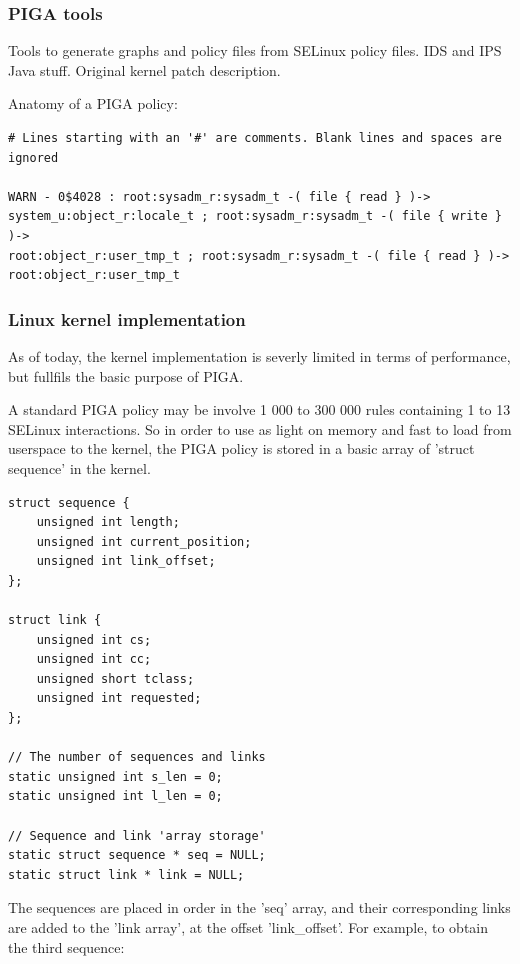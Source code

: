 \documentclass[pdftex,a4paper,titlepage,11pt]{article}
\begin{document}
\subsubsection{PIGA tools}

Tools to generate graphs and policy files from SELinux policy files. IDS and IPS
Java stuff. Original kernel patch description.

Anatomy of a PIGA policy:

\begin{lstlisting}
# Lines starting with an '#' are comments. Blank lines and spaces are ignored

WARN - 0$4028 : root:sysadm_r:sysadm_t -( file { read } )->
system_u:object_r:locale_t ; root:sysadm_r:sysadm_t -( file { write } )->
root:object_r:user_tmp_t ; root:sysadm_r:sysadm_t -( file { read } )->
root:object_r:user_tmp_t
\end{lstlisting}


\subsubsection{Linux kernel implementation}

As of today, the kernel implementation is severly limited in terms of
performance, but fullfils the basic purpose of PIGA.

\bigskip

A standard PIGA policy may be involve 1 000 to 300 000 rules containing 1 to 13
SELinux interactions. So in order to use as light on memory and fast to load
from userspace to the kernel, the PIGA policy is stored in a basic array of
'struct sequence' in the kernel.

\begin{lstlisting}
struct sequence {
	unsigned int length;
	unsigned int current_position;
	unsigned int link_offset;
};

struct link {
	unsigned int cs;
	unsigned int cc;
	unsigned short tclass;
	unsigned int requested;
};

// The number of sequences and links
static unsigned int s_len = 0;
static unsigned int l_len = 0;

// Sequence and link 'array storage'
static struct sequence * seq = NULL;
static struct link * link = NULL;
\end{lstlisting}

\smallskip

The sequences are placed in order in the 'seq' array, and their corresponding
links are added to the 'link array', at the offset 'link\_offset'. For example,
to obtain the third sequence:
\end{document}

